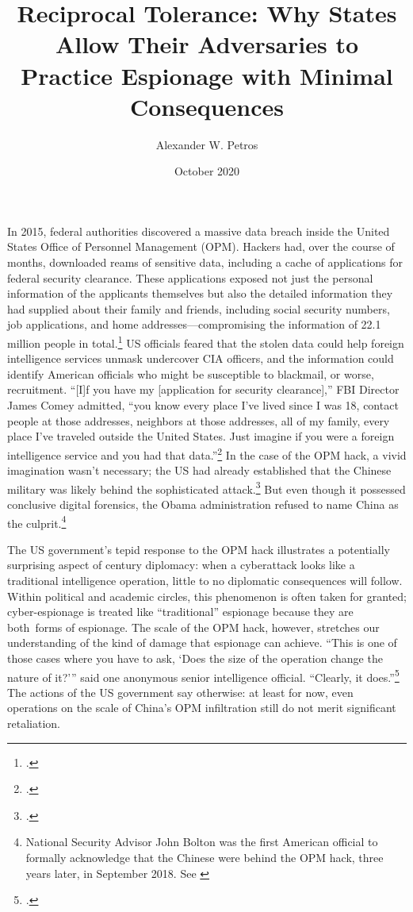 \documentclass[14pt]{extarticle}
\title{Reciprocal Tolerance: Why States Allow Their Adversaries to Practice Espionage with Minimal Consequences}
\author{Alexander W. Petros}
\date{October 2020}
\begin{document}
\maketitle

In 2015, federal authorities discovered a massive data breach inside the United States Office of Personnel Management (OPM). Hackers had, over the course of months, downloaded reams of sensitive data, including a cache of applications for federal security clearance. These applications exposed not just the personal information of the applicants themselves but also the detailed information they had supplied about their family and friends, including social security numbers, job applications, and home addresses---compromising the information of 22.1 million people in total.\footcite{nakashima_hacks_2015} US officials feared that the stolen data could help foreign intelligence services unmask undercover CIA officers, and the information could identify American officials who might be susceptible to blackmail, or worse, recruitment. \enquote{[I]f you have my [application for security clearance],} FBI Director James Comey admitted, ``you know every place I've lived since I was 18, contact people at those addresses, neighbors at those addresses, all of my family, every place I've traveled outside the United States. Just imagine if you were a foreign intelligence service and you had that data.''\footcite{nakashima_hacks_2015} In the case of the OPM hack, a vivid imagination wasn't necessary; the US had already established that the Chinese military was likely behind the sophisticated attack.\footcite{koerner_inside_2016} But even though it possessed conclusive digital forensics, the Obama administration refused to name China as the culprit.\footnote{National Security Advisor John Bolton was the first American official to formally acknowledge that the Chinese were behind the OPM hack, three years later, in September 2018. See \cite{sanger_trump_2018}}

The US government's tepid response to the OPM hack illustrates a potentially surprising aspect of  century diplomacy: when a cyberattack looks like a traditional intelligence operation, little to no diplomatic consequences will follow. Within political and academic circles, this phenomenon is often taken for granted; cyber-espionage is treated like \enquote{traditional} espionage because they are both forms of espionage. The scale of the OPM hack, however, stretches our understanding of the kind of damage that espionage can achieve. ``This is one of those cases where you have to ask, `Does the size of the operation change the nature of it?'\thinspace'' said one anonymous senior intelligence official. \enquote{Clearly, it does.}\footcite{sanger_u.s._2015} The actions of the US government say otherwise: at least for now, even operations on the scale of China's OPM infiltration still do not merit significant retaliation.
\end{document}
